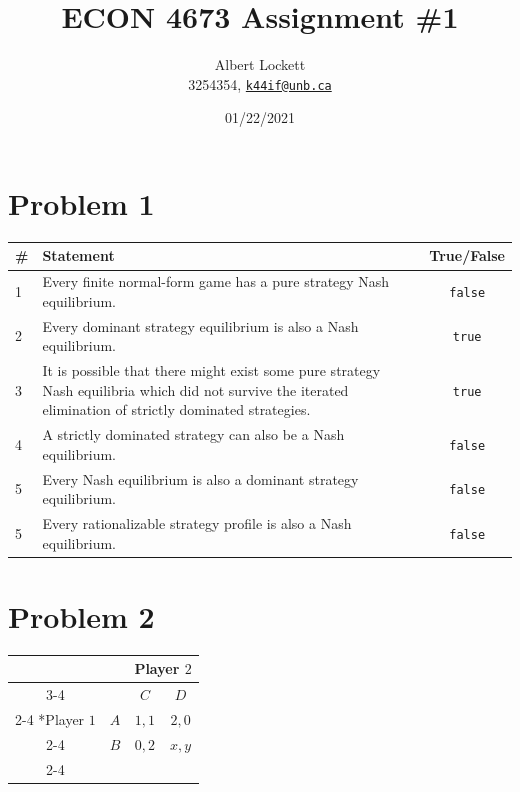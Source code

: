 \documentclass[a4paper,11pt]{article}
\begin{document}
\title{ECON 4673 Assignment \#1}
\author{
  Albert Lockett \\ 
  3254354, 
  \href{mailto:me@somewhere.com}{\texttt{k44if@unb.ca}}
  }
\date{01/22/2021}

\maketitle

\section*{Problem 1}

\begin{table}[htbp]
  \begin{tabularx}{\textwidth}{lXc}
    {\bf \#} & {\bf Statement} & {\bf True/False}  \\ \hline
    1 & Every finite normal-form game has a pure strategy Nash equilibrium.     & \texttt{false}  \\ 
    2 & Every dominant strategy equilibrium is also a Nash equilibrium.         & \texttt{true}  \\
    3 & It is possible that there might exist some pure strategy Nash 
        equilibria which did not survive the iterated elimination of strictly 
        dominated strategies.                                                   & \texttt{true} \\
    4 & A strictly dominated strategy can also be a Nash equilibrium.           & \texttt{false}  \\
    5 & Every Nash equilibrium is also a dominant strategy equilibrium.         & \texttt{false}  \\
    5 & Every rationalizable strategy profile is also a Nash equilibrium.       & \texttt{false}  \\
  \end{tabularx}
  
\end{table}


\section*{Problem 2}

\begin{table}[htbp]
  \setlength{\extrarowheight}{2pt}
  \begin{tabular}{*{4}{c|}}
    \multicolumn{2}{c}{} & \multicolumn{2}{c}{Player $2$}\\\cline{3-4}
    \multicolumn{1}{c}{}       &     &   $C$ &   $D$   \\\cline{2-4}
    \multirow{2}*{Player $1$}  & $A$ & $1,1$ & $2,0$ \\\cline{2-4}
                               & $B$ & $0,2$ & $x,y$ \\\cline{2-4}
  \end{tabular}
\end{table}
\end{document}

